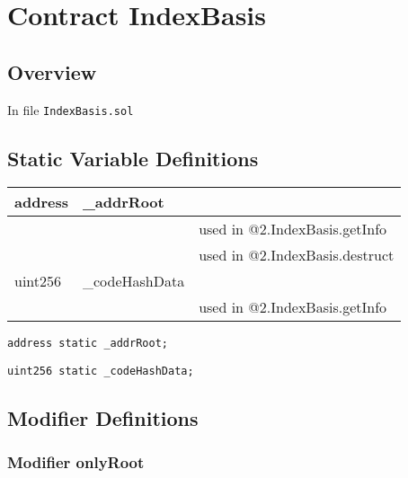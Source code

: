 
\chapter{Contract IndexBasis}

\minitoc

\section{Overview}


In file {\tt IndexBasis.sol}

\section{Static Variable Definitions}


\ifsoltables
\noindent\begin{tabular}{|l|l|p{5cm}|}\hline
address & \_{}addrRoot &  \\\hline
 & & used in @2.IndexBasis.getInfo\\\hline
 & & used in @2.IndexBasis.destruct\\\hline
uint256 & \_{}codeHashData &  \\\hline
 & & used in @2.IndexBasis.getInfo\\\hline
\end{tabular}
\fi


\begin{lstlisting}[firstnumber=7]
    address static _addrRoot;
\end{lstlisting}

\begin{lstlisting}[firstnumber=8]
    uint256 static _codeHashData;
\end{lstlisting}

\section{Modifier Definitions}


\subsection{Modifier onlyRoot}




